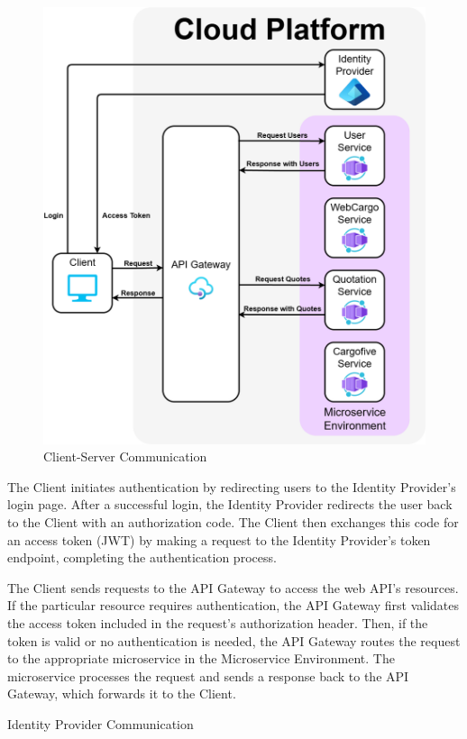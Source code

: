 \documentclass[12pt, reqno, oneside]{amsbook}
\makeatletter
\def\subsection{\@startsection{subsection}{2}%
      \z@{.5\linespacing\@plus.7\linespacing}{.25\linespacing}%
      {\normalfont\bfseries\flushleft}}
\theoremstyle{definition}
\theoremstyle{definition}
\numberwithin{section}{chapter}
\numberwithin{table}{chapter}
\numberwithin{figure}{chapter}
\makeatother
\begin{document}
\begin{figure}[H]
  \centering
  \includegraphics[width=0.9\linewidth]{images/ClientServerCommunication.png}
  \caption{\label{Figure:ClientServerCommunication}Client-Server Communication}
\end{figure}

The Client initiates authentication by redirecting users to the Identity Provider's login page. After a successful login, the Identity Provider redirects the user back to the Client with an authorization code. The Client then exchanges this code for an access token (\ac{JWT}) by making a request to the Identity Provider's token endpoint, completing the authentication process.

The Client sends requests to the \ac{API} Gateway to access the web \ac{API}'s resources. If the particular resource requires authentication, the \ac{API} Gateway first validates the access token included in the request's authorization header. Then, if the token is valid or no authentication is needed, the \ac{API} Gateway routes the request to the appropriate microservice in the Microservice Environment. The microservice processes the request and sends a response back to the \ac{API} Gateway, which forwards it to the Client.

\subsection{Identity Provider Communication}
\end{document}
